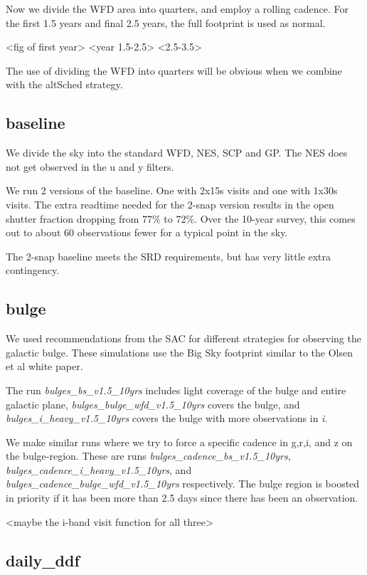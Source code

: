 Now we divide the WFD area into quarters, and employ a rolling cadence. For the first 1.5 years and final 2.5 years, the full footprint is used as normal. 

<fig of first year> <year 1.5-2.5> <2.5-3.5>

The use of dividing the WFD into quarters will be obvious when we combine with the altSched strategy.


\subsection{baseline}

We divide the sky into the standard WFD, NES, SCP and GP. The NES does not get observed in the u and y filters. 

We run 2 versions of the baseline. One with 2x15s visits and one with 1x30s visits. The extra readtime needed for the 2-snap version results in the open shutter fraction dropping from 77\% to 72\%. Over the 10-year survey, this comes out to about 60 observations fewer for a typical point in the sky. 

The 2-snap baseline meets the SRD requirements, but has very little extra contingency.

\subsection{bulge}

We used recommendations from the SAC for different strategies for observing the galactic bulge. These simulations use the Big Sky footprint similar to the Olsen et al white paper.  

The run \emph{bulges\_bs\_v1.5\_10yrs} includes light coverage of the bulge and entire galactic plane, \emph{bulges\_bulge\_wfd\_v1.5\_10yrs} covers the bulge, and \emph{bulges\_i\_heavy\_v1.5\_10yrs} covers the bulge with more observations in \emph{i}. 

We make similar runs where we try to force a specific cadence in g,r,i, and z on the bulge-region. These are runs \emph{bulges\_cadence\_bs\_v1.5\_10yrs}, \emph{bulges\_cadence\_i\_heavy\_v1.5\_10yrs}, and \emph{bulges\_cadence\_bulge\_wfd\_v1.5\_10yrs} respectively. The bulge region is boosted in priority if it has been more than 2.5 days since there has been an observation.

<maybe the i-band visit function for all three>


\subsection{daily\_ddf}

